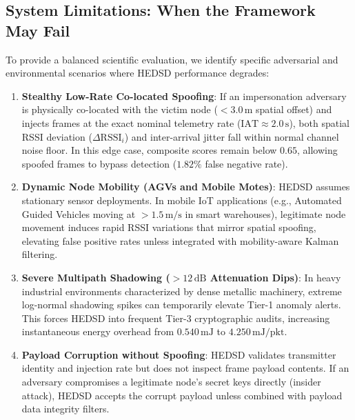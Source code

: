 \documentclass[conference]{IEEEtran}
\begin{document}
\begin{enumerate}
\subsection{System Limitations: When the Framework May Fail}
To provide a balanced scientific evaluation, we identify specific adversarial and environmental scenarios where HEDSD performance degrades:
\begin{enumerate}
    \item \textbf{Stealthy Low-Rate Co-located Spoofing}: If an impersonation adversary is physically co-located with the victim node ($<3.0\,\text{m}$ spatial offset) and injects frames at the exact nominal telemetry rate ($\text{IAT} \approx 2.0\,\text{s}$), both spatial RSSI deviation ($\Delta\text{RSSI}_i$) and inter-arrival jitter fall within normal channel noise floor. In this edge case, composite scores remain below $0.65$, allowing spoofed frames to bypass detection ($1.82\%$ false negative rate).
    \item \textbf{Dynamic Node Mobility (AGVs and Mobile Motes)}: HEDSD assumes stationary sensor deployments. In mobile IoT applications (e.g., Automated Guided Vehicles moving at $>1.5\,\text{m/s}$ in smart warehouses), legitimate node movement induces rapid RSSI variations that mirror spatial spoofing, elevating false positive rates unless integrated with mobility-aware Kalman filtering.
    \item \textbf{Severe Multipath Shadowing ($>12\,\text{dB}$ Attenuation Dips)}: In heavy industrial environments characterized by dense metallic machinery, extreme log-normal shadowing spikes can temporarily elevate Tier-1 anomaly alerts. This forces HEDSD into frequent Tier-3 cryptographic audits, increasing instantaneous energy overhead from $0.540\,\text{mJ}$ to $4.250\,\text{mJ/pkt}$.
    \item \textbf{Payload Corruption without Spoofing}: HEDSD validates transmitter identity and injection rate but does not inspect frame payload contents. If an adversary compromises a legitimate node's secret keys directly (insider attack), HEDSD accepts the corrupt payload unless combined with payload data integrity filters.
\end{enumerate}


\end{enumerate}
\end{document}
